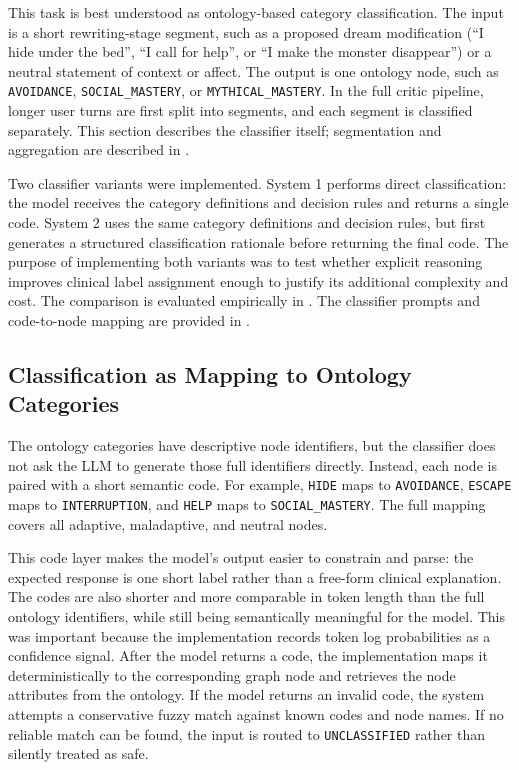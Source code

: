 This task is best understood as ontology-based category classification. The input is a short rewriting-stage segment, such as a proposed dream modification (``I hide under the bed'', ``I call for help'', or ``I make the monster disappear'') or a neutral statement of context or affect. The output is one ontology node, such as \texttt{AVOIDANCE}, \texttt{SOCIAL\_MASTERY}, or \texttt{MYTHICAL\_MASTERY}. In the full critic pipeline, longer user turns are first split into segments, and each segment is classified separately. This section describes the classifier itself; segmentation and aggregation are described in .

Two classifier variants were implemented. System 1 performs direct classification: the model receives the category definitions and decision rules and returns a single code. System 2 uses the same category definitions and decision rules, but first generates a structured classification rationale before returning the final code. The purpose of implementing both variants was to test whether explicit reasoning improves clinical label assignment enough to justify its additional complexity and cost. The comparison is evaluated empirically in . The classifier prompts and code-to-node mapping are provided in .

\subsection{Classification as Mapping to Ontology Categories}

The ontology categories have descriptive node identifiers, but the classifier does not ask the LLM to generate those full identifiers directly. Instead, each node is paired with a short semantic code. For example, \texttt{HIDE} maps to \texttt{AVOIDANCE}, \texttt{ESCAPE} maps to \texttt{INTERRUPTION}, and \texttt{HELP} maps to \texttt{SOCIAL\_MASTERY}. The full mapping covers all adaptive, maladaptive, and neutral nodes.

This code layer makes the model's output easier to constrain and parse: the expected response is one short label rather than a free-form clinical explanation. The codes are also shorter and more comparable in token length than the full ontology identifiers, while still being semantically meaningful for the model. This was important because the implementation records token log probabilities as a confidence signal. After the model returns a code, the implementation maps it deterministically to the corresponding graph node and retrieves the node attributes from the ontology. If the model returns an invalid code, the system attempts a conservative fuzzy match against known codes and node names. If no reliable match can be found, the input is routed to \texttt{UNCLASSIFIED} rather than silently treated as safe.

